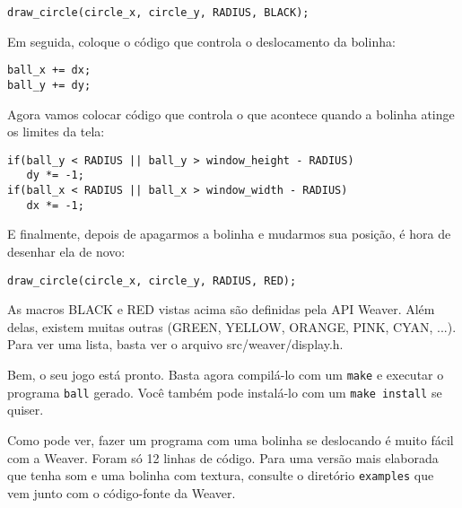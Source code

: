 \documentclass[11pt,a4paper]{book}
\begin{document}
\begin{verbatim}
draw_circle(circle_x, circle_y, RADIUS, BLACK);
\end{verbatim}

Em seguida, coloque o código que controla o deslocamento da bolinha:

\begin{verbatim}
ball_x += dx;
ball_y += dy;
\end{verbatim}

Agora vamos colocar código que controla o que acontece quando a
bolinha atinge os limites da tela:

\begin{verbatim}
if(ball_y < RADIUS || ball_y > window_height - RADIUS)
   dy *= -1;
if(ball_x < RADIUS || ball_x > window_width - RADIUS)
   dx *= -1;
\end{verbatim}

E finalmente, depois de apagarmos a bolinha e mudarmos sua posição, é
hora de desenhar ela de novo:

\begin{verbatim}
draw_circle(circle_x, circle_y, RADIUS, RED);
\end{verbatim}

As macros BLACK e RED vistas acima são definidas pela API Weaver. Além
delas, existem muitas outras (GREEN, YELLOW, ORANGE, PINK, CYAN,
...). Para ver uma lista, basta ver o arquivo src/weaver/display.h.

Bem, o seu jogo está pronto. Basta agora compilá-lo com um
\texttt{make} e executar o programa \texttt{ball} gerado. Você também
pode instalá-lo com um \texttt{make install} se quiser. 

Como pode ver, fazer um programa com uma bolinha se deslocando é muito
fácil com a Weaver. Foram só 12 linhas de código. Para uma versão mais
elaborada que tenha som e uma bolinha com textura, consulte o
diretório \texttt{examples} que vem junto com o código-fonte da
Weaver.
\end{document}
